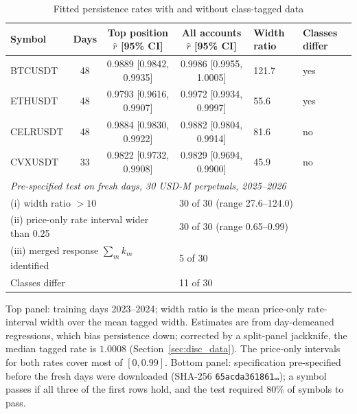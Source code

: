 \begin{table}[t]\centering\small
\begin{threeparttable}
\caption{Fitted persistence rates with and without class-tagged data}\label{tab:disc}
\setlength{\tabcolsep}{3pt}
\begin{tabular}{lcccp{}p{}}
\toprule
Symbol & Days & Top position $\hat r$ [95\% CI] & All accounts $\hat r$ [95\% CI] & Width ratio & Classes differ\\
\midrule
BTCUSDT & 48 & 0.9889 [0.9842, 0.9935] & 0.9986 [0.9955, 1.0005] & 121.7 & yes\\
ETHUSDT & 48 & 0.9793 [0.9616, 0.9907] & 0.9972 [0.9934, 0.9997] & 55.6 & yes\\
CELRUSDT & 48 & 0.9884 [0.9830, 0.9922] & 0.9882 [0.9804, 0.9914] & 81.6 & no\\
CVXUSDT & 33 & 0.9822 [0.9732, 0.9908] & 0.9829 [0.9694, 0.9900] & 45.9 & no\\
\midrule
\multicolumn{6}{l}{\emph{Pre-specified test on fresh days, 30 USD-M perpetuals, 2025--2026}}\\
\multicolumn{3}{l}{(i) width ratio $>10$} & \multicolumn{3}{l}{30 of 30 (range 27.6--124.0)}\\
\multicolumn{3}{l}{(ii) price-only rate interval wider than 0.25} & \multicolumn{3}{l}{30 of 30 (range 0.65--0.99)}\\
\multicolumn{3}{l}{(iii) merged response $\sum_mk_m$ identified} & \multicolumn{3}{l}{5 of 30}\\
\multicolumn{3}{l}{Classes differ} & \multicolumn{3}{l}{11 of 30}\\
\bottomrule
\end{tabular}
\begin{tablenotes}\footnotesize\item Top panel: training days 2023--2024; width ratio is the mean price-only rate-interval width over the mean tagged width. Estimates are from day-demeaned regressions, which bias persistence down; corrected by a split-panel jackknife, the median tagged rate is $1.0008$ (Section~\ref{sec:disc_data}). The price-only intervals for both rates cover most of $[0,0.99]$. Bottom panel: specification pre-specified before the fresh days were downloaded (SHA-256 \texttt{65acda361861\ldots}); a symbol passes if all three of the first rows hold, and the test required 80\% of symbols to pass. \end{tablenotes}
\end{threeparttable}
\end{table}

